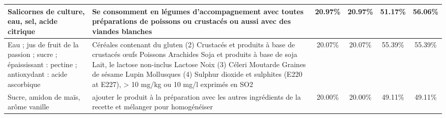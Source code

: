 \begin{tabular}{p{5cm}p{5cm}cccc}
                                                                                                                                                                                                                                          Salicornes de culture, eau, sel, acide citrique &                                                                                                                                                                                                                              Se consomment en légumes d'accompagnement avec toutes préparations de poissons ou crustacés ou aussi avec des viandes blanches &  20.97\% &  20.97\% &  51.17\% &   56.06\% \\ \hline
                                                                                                                                                                                       Eau ; jus de fruit de la passion ; sucre ; épaississant : pectine ; antioxydant : acide ascorbique &  Céréales contenant du gluten (2)  \newline Crustacés et produits à base de crustacés  \newline œufs  \newline Poissons  \newline Arachides  \newline Soja et produits à base de soja  \newline Lait, le lactose non-inclus  \newline Lactose  \newline Noix  (3)  \newline Céleri  \newline Moutarde  \newline Graines de sésame  \newline Lupin  \newline Mollusques  (4)  \newline Sulphur dioxide et sulphites (E220 at E227), > 10  \newline mg/kg ou 10 mg/l exprimés en SO2  &  20.07\% &  20.07\% &  55.39\% &   55.39\% \\ \hline
                                                                                                                                                                                                                                                     Sucre, amidon de maïs, arôme vanille &                                                                                                                                                                                                                                                 ajouter le produit à la préparation avec les autres ingrédients de la recette et mélanger pour homogénéiser &  20.00\% &  20.00\% &  49.11\% &   49.11\% \\ \hline

\end{tabular}
